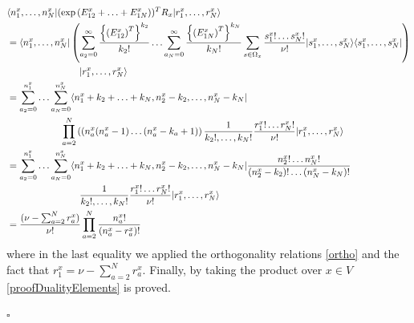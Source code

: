 \documentclass[11pt]{article}
\numberwithin{equation}{section}
\numberwithin{equation}{subsection}
\begin{document}
\begin{align*}
&\langle n_{1}^{x},\ldots,n_{N}^{x}|(\exp{(E_{12}^{x}+\ldots+E_{1N}^{x})})^{T}R_{x}|r_{1}^{x},\ldots,r_{N}^{x}\rangle\\&= \langle  n_{1}^{x},\ldots,n_{N}^{x}|\left(\sum_{a_{2}=0}^{\infty}\frac{\left\{\left(E_{12}^{x}\right)^{T}\right\}^{k_{2}}}{k_{2}!}\ldots\sum_{a_{N}=0}^{\infty}\frac{\left\{\left(E_{1N}^{x}\right)^{T}\right\}^{k_{N}}}{k_{N}!}\sum_{s\in\Omega_{x}}\frac{s_{1}^{x}!\ldots s_{N}^{x}!}{\nu!}|s_{1}^{x},\ldots,s_{N}^{x}\rangle\langle s_{1}^{x},\ldots,s_{N}^{x}|\right)
\\&
\hspace{2.cm}\qquad|r_{1}^{x},\ldots,r_{N}^{x}\rangle
\\&=
\sum_{a_{2}=0}^{n_{1}^{x}}\ldots\sum_{a_{N}=0}^{n_{N}^{x}}\langle n_{1}^{x}+k_{2}+\ldots+k_{N},n_{2}^{x}-k_{2},\ldots,n_{N}^{x}-k_{N}|
\\&
\hspace{2.cm}\prod_{a=2}^{N}\left((n_{a}^{x}(n_{a}^{x}-1)\ldots (n_{a}^{x}-k_{a}+1)\right)\frac{1}{k_{2}!,\ldots,k_{N}!}\frac{r_{1}^{x}!\ldots r_{N}^{x}!}{\nu!}|r_{1}^{x},\ldots,r_{N}^{x}\rangle
\\&=
\sum_{a_{2}=0}^{n_{1}^{x}}\ldots\sum_{a_{N}=0}^{n_{N}^{x}}\langle n_{1}^{x}+k_{2}+\ldots+k_{N},n_{2}^{x}-k_{2},\ldots,n_{N}^{x}-k_{N}|\frac{n_{2}^{x}!\ldots n_{N}^{x}!}{(n_{2}^{x}-k_{2})!\ldots(n_{N}^{x}-k_{N})!}
\\& 
\hspace{2.cm}\qquad\frac{1}{k_{2}!,\ldots,k_{N}!}\frac{r_{1}^{x}!\ldots r_{N}^{x}!}{\nu!}|r_{1}^{x},\ldots,r_{N}^{x}\rangle
\\&=
\frac{(\nu-\sum_{a=2}^{N}r_{a}^{x})}{\nu!}\prod_{a=2}^{N}\frac{n_{a}^{x}!}{(n_{a}^{x}-r_{a}^{x})!}
\end{align*}
where in the last equality we applied the orthogonality relations \eqref{ortho} and the fact that $r_{1}^{x}=\nu-\sum_{a=2}^{N}r_{a}^{x}$. Finally, by taking the product over $x\in V$ \eqref{proofDualityElements} is proved.
\begin{flushright}
    $\square$
\end{flushright}
\end{document}
